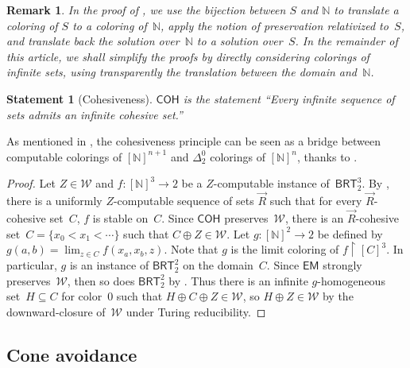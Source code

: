 \documentclass{article}
\def\W{\mathcal{W}}
\newcommand{\uh}{\upharpoonright}
\newcommand{\EM}[0]{\mathsf{EM}}
\newcommand{\COH}[0]{\mathsf{COH}}
\newcommand{\BRT}[0]{\mathsf{BRT}}
\newcommand{\NN}[0]{\mathbb{N}}
\def\qt#1{``#1''}%
\newtheorem*{statement}{Statement}
\numberwithin{theorem}{section}
\newtheorem{remark}[theorem]{Remark}
\newtheorem{corollary}[theorem]{Corollary}
\begin{document}
\begin{remark}
In the proof of , we use the bijection between $S$ and $\NN$ to translate a coloring of $S$ to a coloring of~$\NN$, apply the notion of preservation relativized to~$S$, and translate back the solution over~$\NN$ to a solution over~$S$. In the remainder of this article, we shall simplify the proofs by directly considering colorings of infinite sets, using transparently the translation between the domain and~$\NN$. 
\end{remark}

\begin{statement}[Cohesiveness]
$\COH$ is the statement \qt{Every infinite sequence of sets admits an infinite cohesive set.}
\end{statement}

As mentioned in , the cohesiveness principle can be seen as a bridge between computable colorings of $[\NN]^{n+1}$ and $\Delta^0_2$ colorings of $[\NN]^n$, thanks to .

\begin{proof}
Let $Z \in \W$ and $f : [\NN]^3 \to 2$ be a $Z$-computable instance of~$\BRT^3_2$.
By , there is a uniformly $Z$-computable sequence of sets $\vec{R}$ such that for every $\vec{R}$-cohesive set~$C$, $f$ is stable on~$C$. Since $\COH$ preserves~$\W$, there is an $\vec{R}$-cohesive set~$C = \{ x_0 < x_1 < \cdots \}$
such that $C \oplus Z \in \W$. Let $g : [\NN]^2 \to 2$ be defined by $g(a, b) = \lim_{z \in C} f(x_a, x_b, z)$. Note that $g$ is the limit coloring of $f \uh [C]^3$. In particular, $g$ is an instance of $\BRT^2_2$ on the domain~$C$. Since $\EM$ strongly preserves~$\W$, then so does $\BRT^2_2$ by . Thus there is an infinite $g$-homogeneous set~$H \subseteq C$ for color~0 such that $H \oplus C \oplus Z \in \W$, so $H \oplus Z \in \W$ by the downward-closure of~$\W$ under Turing reducibility.
\end{proof}

\subsection{Cone avoidance}
\end{document}
